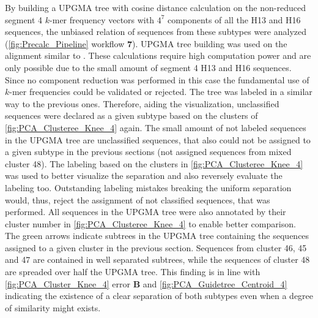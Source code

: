 \vspace{1em}

By building a \gls{UPGMA} tree with cosine distance calculation on the non-reduced segment 4 $k$-mer frequency vectors with $4^7$ components of all the H13 and H16 sequences, the unbiased relation of sequences from these subtypes were analyzed (\autoref{fig:Precalc_Pipeline} workflow \textsf{\textbf{7}}). \gls{UPGMA} tree building was used on the alignment similar to \textcite{moss_identification_2011}. These calculations require high computation power and are only possible due to the small amount of segment 4 H13 and H16 sequences. Since no component reduction was performed in this case the fundamental use of $k$-mer frequencies could be validated or rejected. The tree was labeled in a similar way to the previous ones. Therefore, aiding the visualization, unclassified sequences were declared as a given subtype based on the clusters of \autoref{fig:PCA_Clusteree_Knee_4} again. The small amount of not labeled sequences in the \gls{UPGMA} tree are unclassified sequences, that also could not be assigned to a given subtype in the previous sections (not assigned sequences from mixed cluster 48). The labeling based on the clusters in \autoref{fig:PCA_Clusteree_Knee_4} was used to better visualize the separation and also reversely evaluate the labeling too. Outstanding labeling mistakes breaking the uniform separation would, thus, reject the assignment of not classified sequences, that was performed. All sequences in the \gls{UPGMA} tree were also annotated by their cluster number in \autoref{fig:PCA_Clusteree_Knee_4} to enable better comparison. The green arrows indicate subtrees in the \gls{UPGMA} tree containing the sequences assigned to a given cluster in the previous section. Sequences from cluster 46, 45 and 47 are contained in well separated subtrees, while the sequences of cluster 48 are spreaded over half the \gls{UPGMA} tree. This finding is in line with \autoref{fig:PCA_Cluster_Knee_4} error \textbf{\textsf{B}} and \autoref{fig:PCA_Guidetree_Centroid_4} indicating the existence of a clear separation of both subtypes even when a degree of similarity might exists.

